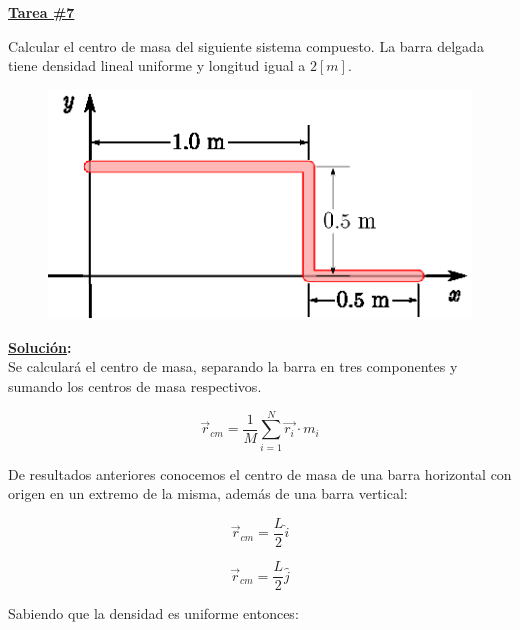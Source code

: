 \documentclass[letter,11pt]{article}
\begin{document}
\begin{center}
    {\Large \bf{\underline{Tarea \#7}}}
\end{center}

Calcular el centro de masa del siguiente sistema compuesto. La barra delgada
tiene densidad lineal uniforme y longitud igual a $2 [m]$.

\begin{figure}[!h]
\centering
\includegraphics[scale=1.25]{resources/f1.eps}
\end{figure}

\vspace{0.5cm}
\textbf{\underline{Solución}:} \\

Se calculará el centro de masa, separando la barra en tres componentes y sumando
los centros de masa respectivos.

\begin{equation}
    \vec{r}_{cm} = \frac{1}{M} \sum_{i=1}^{N} \vec{r_i} \cdot m_i
\label{base}
\tag{centro de masa}
\end{equation}

\vspace{0.5cm}
De resultados anteriores conocemos el centro de masa de una barra horizontal con
origen en un extremo de la misma, además de una barra vertical:

\begin{equation}
    \vec{r}_{cm} = \frac{L}{2} \hat{i}
\label{horizontal}
\tag{barra horizontal}
\end{equation}

\begin{equation}
    \vec{r}_{cm} = \frac{L}{2} \hat{j}
\label{horizontal}
\tag{barra vertical}
\end{equation}

\vspace{0.5cm}
Sabiendo que la densidad es uniforme entonces:
\end{document}

